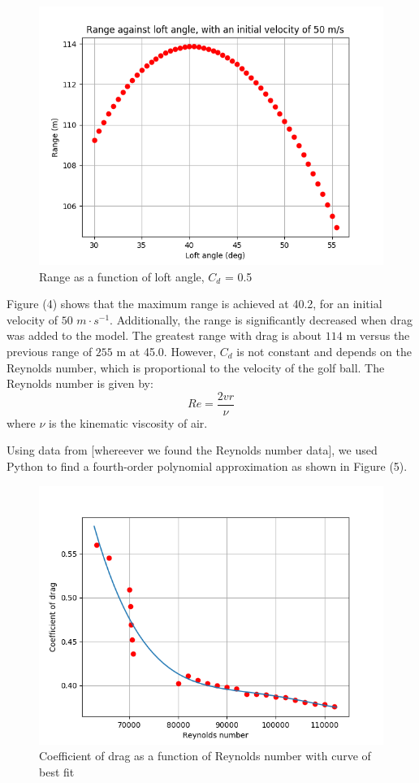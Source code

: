 \documentclass[12pt]{article}
\begin{document}
\begin{figure}[H]
\centering
\caption{Range as a function of loft angle, $C_d$ = 0.5}
\includegraphics[scale=0.9]{dragapproxrange}
\end{figure}

Figure (4) shows that the maximum range is achieved at 40.2\degree, for an initial velocity of $50$ $m\cdot s^{-1}$. Additionally, the range is significantly decreased when drag was added to the model. The greatest range with drag is about $114$ m versus the previous range of $255$ m at 45.0\degree.
However, $C_d$ is not constant and depends on the Reynolds number, which is proportional to the velocity of the golf ball. The Reynolds number is given by:
\begin{equation}
Re=\frac{2vr}{\nu}
\end{equation}
where $\nu$ is the kinematic viscosity of air.

Using data from [whereever we found the Reynolds number data], we used Python to find a fourth-order polynomial approximation as shown in Figure (5).

\begin{figure}[H]
\centering
\caption{Coefficient of drag as a function of Reynolds number with curve of best fit}
\includegraphics[scale=0.85]{reynolds}
\end{figure}
\end{document}
